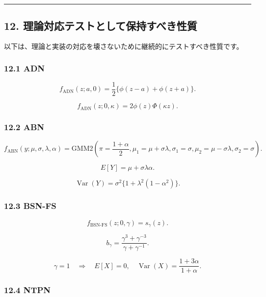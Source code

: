 \documentclass[
]{article}
\begin{document}
\begin{center}\rule{0.5\linewidth}{0.5pt}\end{center}

\hypertarget{ux7406ux8ad6ux5bfeux5fdcux30c6ux30b9ux30c8ux3068ux3057ux3066ux4fddux6301ux3059ux3079ux304dux6027ux8cea}{%
\subsection{12.
理論対応テストとして保持すべき性質}\label{ux7406ux8ad6ux5bfeux5fdcux30c6ux30b9ux30c8ux3068ux3057ux3066ux4fddux6301ux3059ux3079ux304dux6027ux8cea}}

以下は、理論と実装の対応を壊さないために継続的にテストすべき性質です。

\hypertarget{adn}{%
\subsubsection{12.1 ADN}\label{adn}}

\[
f_{\mathrm{ADN}}(z;a,0)=\frac{1}{2}\{\phi(z-a)+\phi(z+a)\}.
\]

\[
f_{\mathrm{ADN}}(z;0,\kappa)=2\phi(z)\Phi(\kappa z).
\]

\hypertarget{abn}{%
\subsubsection{12.2 ABN}\label{abn}}

\[
f_{\mathrm{ABN}}(y;\mu,\sigma,\lambda,\alpha)
=\mathrm{GMM2}\left(
\pi=\frac{1+\alpha}{2},
\mu_1=\mu+\sigma\lambda,
\sigma_1=\sigma,
\mu_2=\mu-\sigma\lambda,
\sigma_2=\sigma
\right).
\]

\[
E[Y]=\mu+\sigma\lambda\alpha.
\]

\[
\operatorname{Var}(Y)=\sigma^2\{1+\lambda^2(1-\alpha^2)\}.
\]

\hypertarget{bsn-fs}{%
\subsubsection{12.3 BSN-FS}\label{bsn-fs}}

\[
f_{\mathrm{BSN\text{-}FS}}(z;0,\gamma)=s_\gamma(z).
\]

\[
b_\gamma=\frac{\gamma^3+\gamma^{-3}}{\gamma+\gamma^{-1}}.
\]

\[
\gamma=1
\quad\Rightarrow\quad
E[X]=0,\quad
\operatorname{Var}(X)=\frac{1+3\alpha}{1+\alpha}.
\]

\hypertarget{ntpn}{%
\subsubsection{12.4 NTPN}\label{ntpn}}
\end{document}
